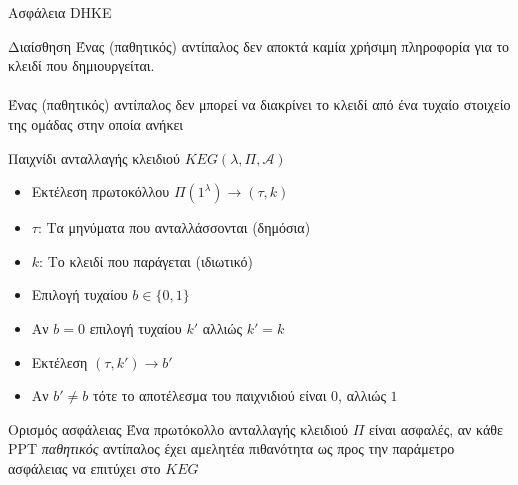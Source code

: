 \documentclass[handout]{beamer}
\begin{document}
\begin{frame}[allowframebreaks]{Ασφάλεια DHKE}

\begin{block}{Διαίσθηση}
Ένας (παθητικός) αντίπαλος δεν αποκτά καμία χρήσιμη πληροφορία για το κλειδί που δημιουργείται.\\
\\
Ένας (παθητικός) αντίπαλος δεν μπορεί να διακρίνει το κλειδί από ένα τυχαίο στοιχείο της ομάδας στην οποία ανήκει
\end{block}

\framebreak

\begin{block}{Παιχνίδι ανταλλαγής κλειδιού $KEG(\lambda,\Pi,\mathcal{A})$}
\begin{itemize}
\item Εκτέλεση πρωτοκόλλου $\Pi(1^\lambda) \rightarrow (\tau,k)$
\item $\tau$: Τα μηνύματα που ανταλλάσσονται (δημόσια)
\item $k$: Το κλειδί που παράγεται (ιδιωτικό)
\item Επιλογή τυχαίου $b \in \{0,1\}$
\item Αν $b = 0$ επιλογή τυχαίου $k'$ αλλιώς $k'=k$
\item Εκτέλεση \adv$(\tau,k') \rightarrow b'$
\item Αν $b'\neq b$ τότε το αποτέλεσμα του παιχνιδιού είναι $0$, αλλιώς $1$
\end{itemize}
\end{block}

\framebreak

\begin{block}{Ορισμός ασφάλειας}
Ένα πρωτόκολλο ανταλλαγής κλειδιού $\Pi$ είναι ασφαλές, αν κάθε PPT \emph{παθητικός} αντίπαλος \adv έχει αμελητέα πιθανότητα ως προς την παράμετρο ασφάλειας να επιτύχει στο $KEG$

\medskip
\medskip

\end{block}

\end{frame}
\end{document}
